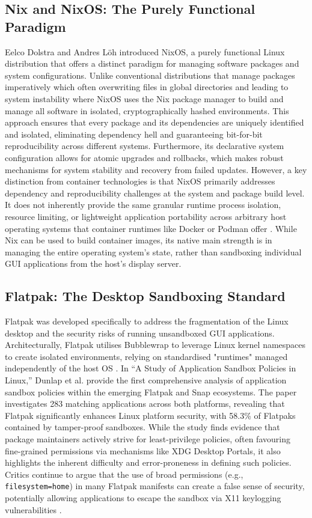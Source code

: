\documentclass[journal,onecolumn]{IEEEtran}
\begin{document}
\subsection{Nix and NixOS: The Purely Functional Paradigm}
Eelco Dolstra and Andres L\"{o}h \cite{10.1145/1411204.1411255, 10.1145/1411203.1411255} introduced NixOS, a purely functional Linux distribution that offers a distinct paradigm for managing software packages and system configurations. Unlike conventional distributions that manage packages imperatively which often overwriting files in global directories and leading to system instability \cite{Varun2019} where NixOS uses the Nix package manager to build and manage all software in isolated, cryptographically hashed environments. This approach ensures that every package and its dependencies are uniquely identified and isolated, eliminating dependency hell and guaranteeing bit-for-bit reproducibility across different systems. Furthermore, its declarative system configuration allows for atomic upgrades and rollbacks, which makes robust mechanisms for system stability and recovery from failed updates. However, a key distinction from container technologies is that NixOS primarily addresses dependency and reproducibility challenges at the system and package build level. It does not inherently provide the same granular runtime process isolation, resource limiting, or lightweight application portability across arbitrary host operating systems that container runtimes like Docker or Podman offer \cite{Varun2019}. While Nix can be used to build container images, its native main strength is in managing the entire operating system's state, rather than sandboxing individual GUI applications from the host's display server.

\subsection{Flatpak: The Desktop Sandboxing Standard}
Flatpak was developed specifically to address the fragmentation of the Linux desktop and the security risks of running unsandboxed GUI applications. Architecturally, Flatpak utilises Bubblewrap to leverage Linux kernel namespaces to create isolated environments, relying on standardised "runtimes" managed independently of the host OS \cite{Dunlap2022}. In ``A Study of Application Sandbox Policies in Linux,'' Dunlap et al. \cite{10.1145/3532105.3535016} provide the first comprehensive analysis of application sandbox policies within the emerging Flatpak and Snap ecosystems. The paper investigates 283 matching applications across both platforms, revealing that Flatpak significantly enhances Linux platform security, with 58.3\% of Flatpaks contained by tamper-proof sandboxes. While the study finds evidence that package maintainers actively strive for least-privilege policies, often favouring fine-grained permissions via mechanisms like XDG Desktop Portals, it also highlights the inherent difficulty and error-proneness in defining such policies. Critics continue to argue that the use of broad permissions (e.g., \texttt{filesystem=home}) in many Flatpak manifests can create a false sense of security, potentially allowing applications to escape the sandbox via X11 keylogging vulnerabilities \cite{Dunlap2022}.
\end{document}
